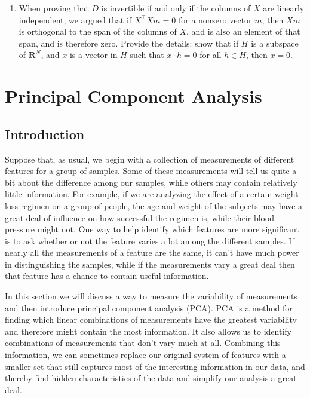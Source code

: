 \documentclass[
  oneside]{scrbook}
\providecommand{\tightlist}{%
  \setlength{\itemsep}{0pt}\setlength{\parskip}{0pt}}
\begin{document}
\begin{enumerate}
\def\labelenumi{\arabic{enumi}.}
\tightlist
\item
  When proving that \(D\) is invertible if and only if the columns of
  \(X\) are linearly independent, we argued that if
  \(X^{\intercal}Xm=0\) for a nonzero vector \(m\), then \(Xm\) is
  orthogonal to the span of the columns of \(X\), and is also an element
  of that span, and is therefore zero. Provide the details: show that if
  \(H\) is a subspace of \(\mathbf{R}^{N}\), and \(x\) is a vector in
  \(H\) such that \(x\cdot h=0\) for all \(h\in H\), then \(x=0\).
\end{enumerate}

\hypertarget{principal-component-analysis}{%
\chapter{Principal Component
Analysis}\label{principal-component-analysis}}

\hypertarget{introduction}{%
\section{Introduction}\label{introduction}}

Suppose that, as usual, we begin with a collection of measurements of
different features for a group of samples. Some of these measurements
will tell us quite a bit about the difference among our samples, while
others may contain relatively little information. For example, if we are
analyzing the effect of a certain weight loss regimen on a group of
people, the age and weight of the subjects may have a great deal of
influence on how successful the regimen is, while their blood pressure
might not. One way to help identify which features are more significant
is to ask whether or not the feature varies a lot among the different
samples. If nearly all the measurements of a feature are the same, it
can't have much power in distinguishing the samples, while if the
measurements vary a great deal then that feature has a chance to contain
useful information.

In this section we will discuss a way to measure the variability of
measurements and then introduce principal component analysis (PCA). PCA
is a method for finding which linear combinations of measurements have
the greatest variability and therefore might contain the most
information. It also allows us to identify combinations of measurements
that don't vary much at all. Combining this information, we can
sometimes replace our original system of features with a smaller set
that still captures most of the interesting information in our data, and
thereby find hidden characteristics of the data and simplify our
analysis a great deal.
\end{document}

